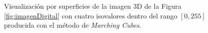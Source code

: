 \begin{figure}[htp]
\begin{center}
  \end{center}
  \caption[Visualización por superficies de la imagen 3D de la Figura \ref{fig:imagenDigital} con cuatro isovalores distintos]{Visualización por superficies de la imagen 3D de la Figura \ref{fig:imagenDigital} con cuatro isovalores dentro del rango $[0,255]$ producida con el método de \emph{Marching Cubes}.}
  \label{fig:visIsoSurface}
  \end{figure}

